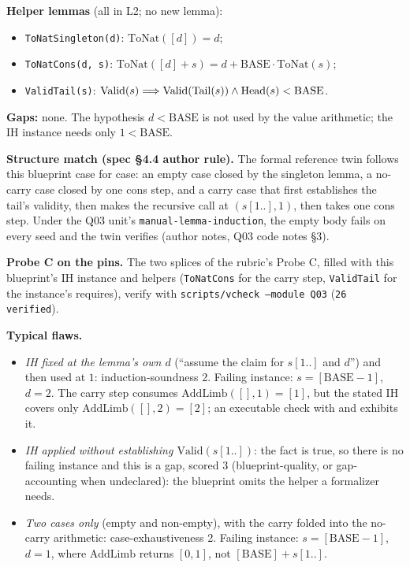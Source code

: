 \documentclass[11pt]{article}
\begin{document}
\textbf{Helper lemmas} (all in L2; no new lemma):
\begin{itemize}
\item \texttt{ToNatSingleton(d)}: $\mathrm{ToNat}([d]) = d$;
\item \texttt{ToNatCons(d, s)}: $\mathrm{ToNat}([d] + s) = d + \mathrm{BASE}\cdot\mathrm{ToNat}(s)$;
\item \texttt{ValidTail(s)}: $\mathrm{Valid}(s) \Longrightarrow \mathrm{Valid}(\mathrm{Tail}(s)) \wedge \mathrm{Head}(s) < \mathrm{BASE}$.
\end{itemize}

\textbf{Gaps:} none. The hypothesis $d < \mathrm{BASE}$ is not used by the
value arithmetic; the IH instance needs only $1 < \mathrm{BASE}$.

\textbf{Structure match (spec \S4.4 author rule).} The formal reference twin
follows this blueprint case for case: an empty case closed by the singleton
lemma, a no-carry case closed by one cons step, and a carry case that first
establishes the tail's validity, then makes the recursive call at
$(s[1..], 1)$, then takes one cons step. Under the Q03 unit's
\texttt{manual-lemma-induction}, the empty body fails on every seed and the
twin verifies (author notes, Q03 code notes \S3).

\textbf{Probe C on the pins.} The two splices of the rubric's Probe C, filled
with this blueprint's IH instance and helpers (\texttt{ToNatCons} for the
carry step, \texttt{ValidTail} for the instance's requires), verify with
\texttt{scripts/vcheck --module Q03} (\texttt{26 verified}).

\textbf{Typical flaws.}
\begin{itemize}
\item \emph{IH fixed at the lemma's own $d$} (``assume the claim for $s[1..]$
  and $d$'') and then used at $1$: induction-soundness 2. Failing instance:
  $s = [\mathrm{BASE} - 1]$, $d = 2$. The carry step consumes
  $\mathrm{AddLimb}([], 1) = [1]$, but the stated IH covers only
  $\mathrm{AddLimb}([], 2) = [2]$; an executable check with
   and
   exhibits it.
\item \emph{IH applied without establishing $\mathrm{Valid}(s[1..])$}: the fact
  is true, so there is no failing instance and this is a gap, scored 3
  (blueprint-quality, or gap-accounting when undeclared): the blueprint omits
  the helper a formalizer needs.
\item \emph{Two cases only} (empty and non-empty), with the carry folded into
  the no-carry arithmetic: case-exhaustiveness 2. Failing instance:
  $s = [\mathrm{BASE} - 1]$, $d = 1$, where $\mathrm{AddLimb}$ returns
  $[0, 1]$, not $[\mathrm{BASE}] + s[1..]$.
\end{itemize}
\end{document}
